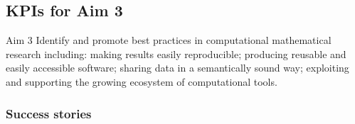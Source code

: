\subsection{KPIs for Aim 3}

\begin{recommendation}{Aim 3}
  Identify and promote best practices in computational mathematical research including: making results easily reproducible; producing
  reusable and easily accessible software; sharing data in a semantically sound way; exploiting and supporting the growing
  ecosystem of computational tools.
\end{recommendation}

\subsubsection{Success stories}

